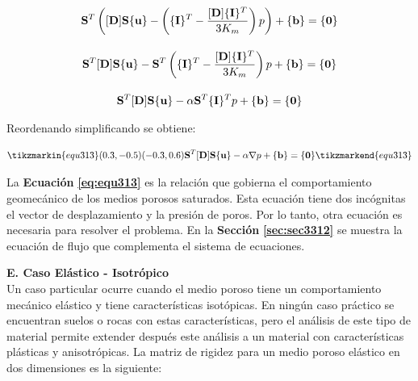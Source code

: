 \begin{ceqn} 
\begin{subequations} \label{eq:equ312} 
\begin{gather}
\normalsize{\mathbf{S}^T\left( [\mathbf{D}]\mathbf{S}\{\mathbf{u}\} - \left(\{\mathbf{I}\}^T - \frac{[\mathbf{D}]\{\mathbf{I}\}^T}{3K_m}\right)p  \right)+\{\mathbf{b}\} = \{\mathbf{0}\}} \label{eq:equ312a} \\[10pt]
\normalsize{\mathbf{S}^T[\mathbf{D}]\mathbf{S}\{\mathbf{u}\} - \mathbf{S}^T\left(\{\mathbf{I}\}^T - \frac{[\mathbf{D}]\{\mathbf{I}\}^T}{3K_m}\right)p + \{\mathbf{b}\}=\{\mathbf{0}\}} \label{eq:equ312b}\\[10pt]
\normalsize{\mathbf{S}^T[\mathbf{D}]\mathbf{S}\{\mathbf{u}\} - \alpha\mathbf{S}^T\{\mathbf{I}\}^Tp + \{\mathbf{b}\}=\{\mathbf{0}\}} \label{eq:equ312c}
\end{gather}  
\end{subequations} 
\end{ceqn}


Reordenando simplificando se obtiene:
\begin{ceqn} 
\begin{gather} \label{eq:equ313}
\tikzmarkin{equ313}(0.3,-0.5)(-0.3,0.6)
\normalsize{\mathbf{S}^T[\mathbf{D}]\mathbf{S}\{\mathbf{u}\} - 
\alpha\mathbf{\nabla}p  + \{\mathbf{b}\} = \{\mathbf{0}\}}
\tikzmarkend{equ313}
\end{gather}  
\end{ceqn}

La \textbf{Ecuación} \textbf{\ref{eq:equ313}} es la relación que gobierna el comportamiento geomecánico de los medios porosos saturados. Esta ecuación tiene dos incógnitas el vector de desplazamiento y la presión de poros. Por lo tanto, otra ecuación es necesaria para resolver el problema. En la \textbf{Sección} \textbf{\ref{sec:sec3312}} se muestra la ecuación de flujo que complementa el sistema de ecuaciones.\vspace{1.0cm}


\textbf{E. Caso Elástico - Isotrópico}
\\
Un caso particular ocurre cuando el medio poroso tiene un comportamiento mecánico elástico y tiene características isotópicas. En ningún caso práctico se encuentran suelos o rocas con estas características, pero el análisis de este tipo de material permite extender después este análisis a un material con características plásticas y anisotrópicas. La matriz de rigidez para un medio poroso elástico en dos dimensiones es la siguiente:\bigskip


